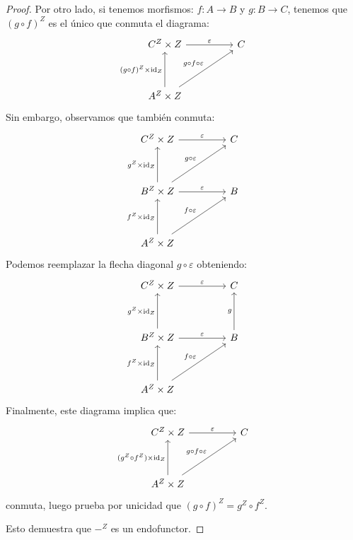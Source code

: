 \begin{proof}
Por otro lado, si tenemos morfismos: $f \colon A \to B$ y $g \colon B \to C$, tenemos que $(g \circ f)^Z$ es el único que conmuta el diagrama:
\[
\begin{tikzcd}
C^Z \times Z \arrow[rr,"\varepsilon"] & & C \\\\
A^Z \times Z \arrow[uu,"(g \circ f)^Z \times\id_Z"]  \arrow[uurr,"g \circ f \circ \varepsilon"]
\end{tikzcd}
\]
Sin embargo, observamos que también conmuta:
\[
\begin{tikzcd}
C^Z \times Z \arrow[rr,"\varepsilon"] & & C\\\\
B^Z \times Z \arrow[rr,"\varepsilon"] \arrow[uu,"g^Z \times \id_Z"] \arrow[uurr,"g \circ \varepsilon"] & & B \\\\
A^Z \times Z \arrow[uu,"f^Z \times\id_Z"]  \arrow[uurr,"f \circ \varepsilon"]
\end{tikzcd}
\]
Podemos reemplazar la flecha diagonal $g \circ \varepsilon$ obteniendo:
\[
\begin{tikzcd}
C^Z \times Z \arrow[rr,"\varepsilon"] & & C\\\\
B^Z \times Z \arrow[rr,"\varepsilon"] \arrow[uu,"g^Z \times \id_Z"] & & B \arrow[uu,"g"] \\\\
A^Z \times Z \arrow[uu,"f^Z \times\id_Z"]  \arrow[uurr,"f \circ \varepsilon"]
\end{tikzcd}
\]
Finalmente, este diagrama implica que:
\[
\begin{tikzcd}
C^Z \times Z \arrow[rr,"\varepsilon"] & & C\\\\
A^Z \times Z \arrow[uu,"(g^Z \circ f^Z) \times\id_Z"]  \arrow[uurr,"g \circ f \circ \varepsilon"]
\end{tikzcd}
\]
conmuta, luego prueba por unicidad que $(g \circ f)^Z = g^Z \circ f^Z$.

Esto demuestra que $-^Z$ es un endofunctor.
\end{proof}



